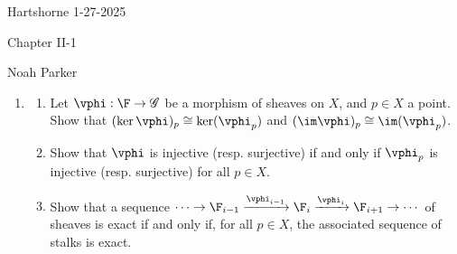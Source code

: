\documentclass[12pt]{amsart}
\newcommand{\G}{\mathscr{G}}
\begin{document}
{Hartshorne} \hfill {1-27-2025}

\bigskip\bigskip

\begin{center}

{\sc Chapter II-1}

\end{center}

\begin{center}

  {Noah Parker} %
    
\end{center}

\bigskip

% 

\begin{enumerate}
	\item[2.] {
      \begin{enumerate}
        \item Let $\vphi:\F\to \G$ be a morphism of sheaves on $X$, and $p\in X$ a point.
          Show that $(\ker\vphi)_p\cong \ker(\vphi_p)$ and $(\im\vphi)_p\cong \im(\vphi_p)$.
        \item Show that $\vphi$ is injective (resp. surjective) if and only if $\vphi_p$ is injective (resp. surjective) for all $p\in X$.
        \item Show that a sequence $\cdots\to \F_{i-1}\xrightarrow{\vphi_{i-1}}\F_i\xrightarrow{\vphi_i}\F_{i+1}\to \cdots$ of sheaves is exact if and only if, for all $p\in X$, the associated sequence of stalks is exact.
      \end{enumerate}
    }
\end{enumerate}
\end{document}
